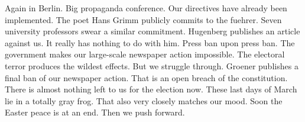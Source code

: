Again in Berlin. Big propaganda conference. Our directives have already been implemented. The poet Hans Grimm publicly commits to the fuehrer. Seven university professors swear a similar commitment. Hugenberg publishes an article against us. It really has nothing to do with him. Press ban upon press ban. The government makes our large-scale newspaper action impossible. The electoral terror produces the wildest effects. But we struggle through. Groener publishes a final ban of our newspaper action. That is an open breach of the constitution. There is almost nothing left to us for the election now. These last days of March lie in a totally gray frog. That also very closely matches our mood. Soon the Easter peace is at an end. Then we push forward.

